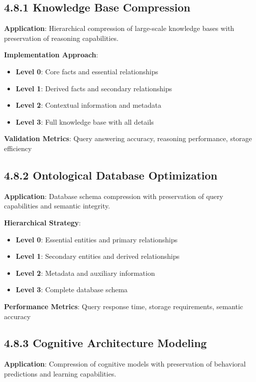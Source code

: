 \subsection{4.8.1 Knowledge Base Compression}

\textbf{Application}: Hierarchical compression of large-scale knowledge bases with preservation of reasoning capabilities.

\textbf{Implementation Approach}:
\begin{itemize}
\item \textbf{Level 0}: Core facts and essential relationships
\item \textbf{Level 1}: Derived facts and secondary relationships  
\item \textbf{Level 2}: Contextual information and metadata
\item \textbf{Level 3}: Full knowledge base with all details
\end{itemize}

\textbf{Validation Metrics}: Query answering accuracy, reasoning performance, storage efficiency

\subsection{4.8.2 Ontological Database Optimization}

\textbf{Application}: Database schema compression with preservation of query capabilities and semantic integrity.

\textbf{Hierarchical Strategy}:
\begin{itemize}
\item \textbf{Level 0}: Essential entities and primary relationships
\item \textbf{Level 1}: Secondary entities and derived relationships
\item \textbf{Level 2}: Metadata and auxiliary information
\item \textbf{Level 3}: Complete database schema
\end{itemize}

\textbf{Performance Metrics}: Query response time, storage requirements, semantic accuracy

\subsection{4.8.3 Cognitive Architecture Modeling}

\textbf{Application}: Compression of cognitive models with preservation of behavioral predictions and learning capabilities.

